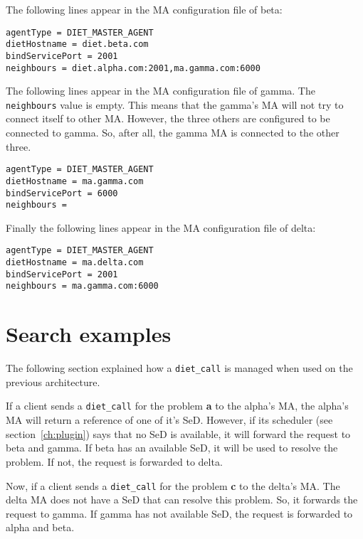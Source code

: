 The following lines appear in the MA configuration file of beta:

\begin{verbatim}
agentType = DIET_MASTER_AGENT
dietHostname = diet.beta.com
bindServicePort = 2001
neighbours = diet.alpha.com:2001,ma.gamma.com:6000
\end{verbatim}

The following lines appear in the MA configuration file of gamma. The
\texttt{neighbours} value is empty. This means that the gamma's MA will not try
to connect itself to other MA. However, the three others are configured to be
connected to gamma. So, after all, the gamma MA is connected to the other
three.

\begin{verbatim}
agentType = DIET_MASTER_AGENT
dietHostname = ma.gamma.com
bindServicePort = 6000
neighbours = 
\end{verbatim}

Finally the following lines appear in the MA configuration file of delta:

\begin{verbatim}
agentType = DIET_MASTER_AGENT
dietHostname = ma.delta.com
bindServicePort = 2001
neighbours = ma.gamma.com:6000
\end{verbatim}

\section{Search examples}

The following section explained how a \texttt{diet\_call} is managed when used
on the previous architecture.

If a client sends a \texttt{diet\_call} for the problem \textbf{a} to the
alpha's MA, the alpha's MA will return a reference of one of it's SeD. However,
if its scheduler (see section~\ref{ch:plugin}) says that no SeD is available,
it will forward the request to beta and gamma. If beta has an available SeD, it
will be used to resolve the problem. If not, the request is forwarded to delta.

Now, if a client sends a \texttt{diet\_call} for the problem \textbf{c} to the
delta's MA. The delta MA does not have a SeD that can resolve this problem. So,
it forwards the request to gamma. If gamma has not available SeD, the request
is forwarded to alpha and beta.
